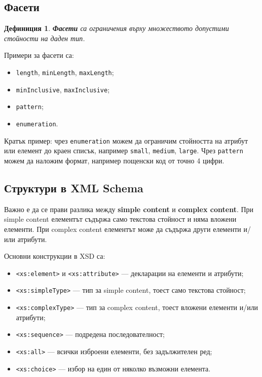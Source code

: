 \documentclass{scrartcl}
\newtheorem{definition}{Дефиниция}
\begin{document}
\begin{FlushLeft}
\subsection{Фасети}

\begin{definition}
\textbf{Фасети} са ограничения върху множеството допустими стойности на даден тип.
\end{definition}

Примери за фасети са:

\begin{itemize}
    \item \texttt{length}, \texttt{minLength}, \texttt{maxLength};
    \item \texttt{minInclusive}, \texttt{maxInclusive};
    \item \texttt{pattern};
    \item \texttt{enumeration}.
\end{itemize}

Кратък пример: чрез \texttt{enumeration} можем да ограничим стойността на атрибут или елемент до краен списък, например \texttt{small}, \texttt{medium}, \texttt{large}. Чрез \texttt{pattern} можем да наложим формат, например пощенски код от точно 4 цифри.

\subsection{Структури в XML Schema}

Важно е да се прави разлика между \textbf{simple content} и \textbf{complex content}. При simple content елементът съдържа само текстова стойност и няма вложени елементи. При complex content елементът може да съдържа други елементи и/или атрибути.

Основни конструкции в XSD са:

\begin{itemize}
    \item \texttt{<xs:element>} и \texttt{<xs:attribute>} --- декларации на елементи и атрибути;
    \item \texttt{<xs:simpleType>} --- тип за simple content, тоест само текстова стойност;
    \item \texttt{<xs:complexType>} --- тип за complex content, тоест вложени елементи и/или атрибути;
    \item \texttt{<xs:sequence>} --- подредена последователност;
    \item \texttt{<xs:all>} --- всички изброени елементи, без задължителен ред;
    \item \texttt{<xs:choice>} --- избор на един от няколко възможни елемента.
\end{itemize}


\end{FlushLeft}
\end{document}
